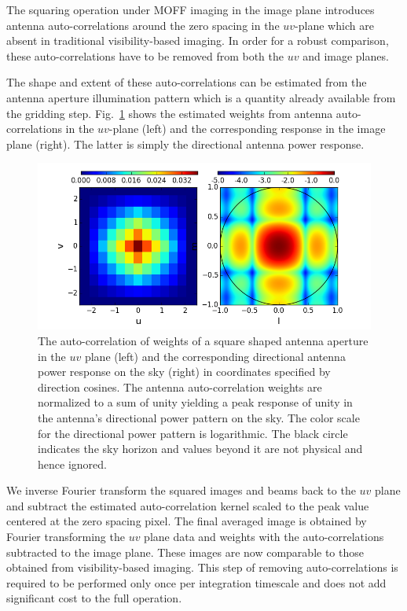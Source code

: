 \documentclass[a4paper,fleqn,usenatbib]{../mnras}
\begin{document}
The squaring operation under MOFF imaging in the image plane introduces antenna 
auto-correlations around the zero spacing in the $uv$-plane which are absent in 
traditional visibility-based imaging. In order for a robust comparison, these 
auto-correlations have to be removed from both the $uv$ and image planes. 

The shape and extent of these auto-correlations can be estimated from the 
antenna aperture illumination pattern which is a quantity already available 
from the gridding step. Fig.~\ref{fig:autocorr_wts_PB} shows the estimated 
weights from antenna auto-correlations in the $uv$-plane (left) and the 
corresponding response in the image plane (right). The latter is simply the 
directional antenna power response. 

\begin{figure}
  \includegraphics[width=\columnwidth]{autocorr_uvwts_pbeam.png}
  \caption{The auto-correlation of weights of a square shaped antenna aperture
    in the $uv$ plane (left) and the corresponding directional antenna power 
    response on the sky (right) in coordinates specified by direction cosines. 
    The antenna auto-correlation weights are normalized to a sum
    of unity yielding a peak response of unity in the antenna's directional
    power pattern on the sky. The color scale for the directional power 
    pattern is logarithmic. The black circle indicates the sky horizon and
    values beyond it are not physical and hence ignored.}
  \label{fig:autocorr_wts_PB}
\end{figure}

We inverse Fourier transform the squared 
images and beams back to the $uv$ plane and subtract the estimated 
auto-correlation kernel scaled to the peak value centered at the zero spacing 
pixel. The final averaged image is obtained by Fourier transforming the $uv$ 
plane data and weights with the auto-correlations subtracted to the image plane. 
These images are now comparable to those obtained from visibility-based imaging. 
This step of removing auto-correlations is required to be performed only once 
per integration timescale and does not add significant cost to the full operation.
\end{document}
